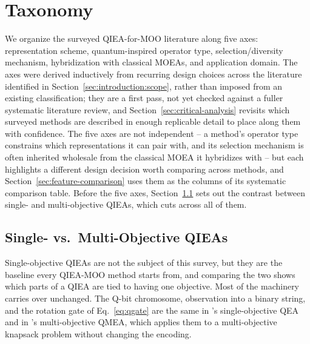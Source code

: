 \section{Taxonomy}
\label{sec:taxonomy}

We organize the surveyed QIEA-for-MOO literature along five axes:
representation scheme, quantum-inspired operator type,
selection/diversity mechanism, hybridization with classical MOEAs, and
application domain. The axes were derived inductively from recurring
design choices across the literature identified in
Section~\ref{sec:introduction:scope}, rather than imposed from an
existing classification; they are a first pass, not yet checked against
a fuller systematic literature review, and
Section~\ref{sec:critical-analysis} revisits which surveyed methods are
described in enough replicable detail to place along them with
confidence. The five axes are not independent -- a method's operator
type constrains which representations it can pair with, and its
selection mechanism is often inherited wholesale from the classical MOEA
it hybridizes with -- but each highlights a different design decision
worth comparing across methods, and Section~\ref{sec:feature-comparison}
uses them as the columns of its systematic comparison table. Before the
five axes, Section~\ref{sec:taxonomy:objectives} sets out the contrast
between single- and multi-objective QIEAs, which cuts across all of
them.

\subsection{Single- vs.\ Multi-Objective QIEAs}
\label{sec:taxonomy:objectives}

Single-objective QIEAs are not the subject of this survey, but they are
the baseline every QIEA-MOO method starts from, and comparing the two
shows which parts of a QIEA are tied to having one objective. Most of
the machinery carries over unchanged. The Q-bit chromosome, observation
into a binary string, and the rotation gate of Eq.~\ref{eq:qgate} are
the same in \citet{han2002qea}'s single-objective QEA and in
\citet{kim2006qmea}'s multi-objective QMEA, which applies them to a
multi-objective knapsack problem without changing the encoding.

